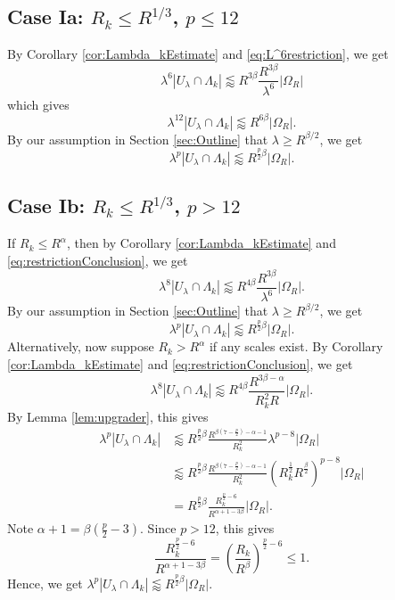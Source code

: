 \documentclass[12pt]{amsart}
\begin{document}
\subsection{Case Ia: $R_k\le R^{1/3}$, $p\le 12$}

By Corollary \ref{cor:Lambda_kEstimate} and \eqref{eq:L^6restriction}, we get $$\lambda^6 |U_\lambda \cap \Lambda_k|\lessapprox R^{3\beta}\frac{R^{3\beta}}{\lambda^6}|\Omega_R|$$ which gives $$\lambda^{12} |U_\lambda \cap \Lambda_k|\lessapprox R^{6\beta}|\Omega_R|.$$ By our assumption in Section \ref{sec:Outline} that $\lambda\ge R^{\beta/2}$, we get $$\lambda^{p} |U_\lambda \cap \Lambda_k|\lessapprox R^{\frac{p}{2}\beta}|\Omega_R|.$$

\subsection{Case Ib: $R_k \le R^{1/3}$, $p>12$} If $R_k\le R^\alpha$, then by Corollary \ref{cor:Lambda_kEstimate} and \eqref{eq:restrictionConclusion}, we get $$\lambda^8 |U_\lambda \cap \Lambda_k|\lessapprox R^{4\beta}\frac{R^{3\beta}}{\lambda^6}|\Omega_R|.$$ By our assumption in Section \ref{sec:Outline} that $\lambda\ge R^{\beta/2}$, we get $$\lambda^{p} |U_\lambda \cap \Lambda_k|\lessapprox R^{\frac{p}{2}\beta}|\Omega_R|.$$
%
Alternatively, now suppose $R_k>R^\alpha$ if any scales exist. By Corollary \ref{cor:Lambda_kEstimate} and \eqref{eq:restrictionConclusion}, we get $$\lambda^8 |U_\lambda \cap \Lambda_k|\lessapprox R^{4\beta}\frac{R^{3\beta-\alpha}}{R_k^2 R}|\Omega_R|.$$ By Lemma \ref{lem:upgrader}, this gives \begin{align*}
    \lambda^p |U_\lambda \cap \Lambda_k|&\lessapprox R^{\frac{p}{2}\beta}\frac{R^{\beta(7-\frac{p}{2})-\alpha-1}}{R_k^2}\lambda^{p-8}|\Omega_R|\\
    &\lessapprox R^{\frac{p}{2}\beta}\frac{R^{\beta(7-\frac{p}{2})-\alpha-1}}{R_k^2}(R_k^{\frac{1}{2}}R^{\frac{\beta}{2}})^{p-8}|\Omega_R|\\
    &= R^{\frac{p}{2}\beta}\frac{R_k^{\frac{p}{2}-6}}{R^{\alpha+1-3\beta}}|\Omega_R|.
\end{align*} Note $\alpha+1 = \beta\left(\frac{p}{2}-3\right)$. Since $p>12$, this gives $$\frac{R_k^{\frac{p}{2}-6}}{R^{\alpha+1-3\beta}}= \left(\frac{R_k}{R^\beta}\right)^{\frac{p}{2}-6}\le 1.$$ Hence, we get $\lambda^{p} |U_\lambda \cap \Lambda_k|\lessapprox R^{\frac{p}{2}\beta}|\Omega_R|.$
\end{document}
